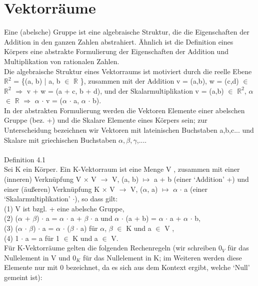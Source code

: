 \documentclass[fontsize=10pt]{scrartcl}
\begin{document}
\section{Vektorräume}
Eine (abelsche) Gruppe ist eine algebraische Struktur, die die Eigenschaften der Addition in den ganzen Zahlen abstrahiert. Ähnlich ist die Definition eines Körpers eine abstrakte Formulierung der Eigenschaften der Addition und Multiplikation von rationalen Zahlen.\\
Die algebraische Struktur eines Vektorraums ist motiviert durch die reelle Ebene $\mathbb{R}^2$ = \{(a, b) | a, b $\in$ $\mathbb{R}$ \}, zusammen mit der Addition v = (a,b), w = (c,d) $\in$ $\mathbb{R}^2$ $\Rightarrow$ v + w = (a + c, b + d), und der Skalarmultiplikation v = (a,b) $\in$ $\mathbb{R}^2$, $\alpha$ $\in$ $\mathbb{R}$ $\Rightarrow$ $\alpha$ $\cdot$ v = ($\alpha$ $\cdot$ a, $\alpha$ $\cdot$ b).\\ 
In der abstrakten Formulierung werden die Vektoren Elemente einer abelschen Gruppe (bez. +) und die Skalare Elemente eines Körpers sein; zur Unterscheidung bezeichnen wir Vektoren mit lateinischen Buchstaben a,b,c... und Skalare mit griechischen Buchstaben $\alpha, \beta, \gamma$,....\\
\\
Definition 4.1\\
Sei K ein Körper. Ein K-Vektorraum ist eine Menge V , zusammen mit einer (inneren) Verknüpfung V $\times$ V $\to$ V, (a, b) $\mapsto$ a + b (einer ‘Addition’ +) und einer (äußeren) Verknüpfung K $\times$ V $\to$ V, ($\alpha$, a) $\mapsto$ $\alpha$ $\cdot$ a (einer ‘Skalarmultiplikation’ $\cdot$), so dass gilt: \\
(1) V ist bzgl. + eine abelsche Gruppe, \\
(2) ($\alpha$ + $\beta$) $\cdot$ a = $\alpha$ $\cdot$ a + $\beta$ $\cdot$ a und $\alpha$ $\cdot$ (a + b) = $\alpha$ $\cdot$ a + $\alpha$ $\cdot$ b,\\ 
(3) ($\alpha$ $\cdot$ $\beta$) $\cdot$ a = $\alpha$ $\cdot$ ($\beta$ $\cdot$ a) für $\alpha$, $\beta$ $\in$ K und a $\in$ V ,\\ 
(4) 1 $\cdot$ a = a für 1 $\in$ K und a $\in$ V.\\
Für K-Vektorräume gelten die folgenden Rechenregeln (wir schreiben 0$_V$ für das Nullelement in V und 0$_K$ für das Nullelement in K; im Weiteren werden diese Elemente nur mit 0 bezeichnet, da es sich aus dem Kontext ergibt, welche ‘Null’ gemeint ist):
\end{document}
